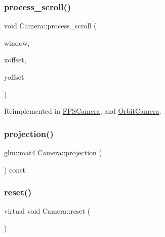 \mbox{\label{classCamera_ac13cc5fa7a3a5c40e53d95e987c1ff04}} 
\subsubsection{\texorpdfstring{process\+\_\+scroll()}{process\_scroll()}}
{\footnotesize\ttfamily void Camera\+::process\+\_\+scroll (\begin{DoxyParamCaption}\item[{G\+L\+F\+Wwindow $\ast$}]{window,  }\item[{double}]{xoffset,  }\item[{double}]{yoffset }\end{DoxyParamCaption})\hspace{0.3cm}{\ttfamily [virtual]}}



Reimplemented in \hyperlink{classFPSCamera_a45640c2e2234cdae4e12bded299e19e8}{F\+P\+S\+Camera}, and \hyperlink{classOrbitCamera_a879faaab86c47e485e119d247279904f}{Orbit\+Camera}.

\mbox{\label{classCamera_afc206d8b4484d0d8c5e7333b34c68c6f}} 
\subsubsection{\texorpdfstring{projection()}{projection()}}
{\footnotesize\ttfamily glm\+::mat4 Camera\+::projection (\begin{DoxyParamCaption}{ }\end{DoxyParamCaption}) const\hspace{0.3cm}{\ttfamily [virtual]}}

\mbox{\label{classCamera_aa7695a960438e5571e14f50ed69f6623}} 
\subsubsection{\texorpdfstring{reset()}{reset()}}
{\footnotesize\ttfamily virtual void Camera\+::reset (\begin{DoxyParamCaption}{ }\end{DoxyParamCaption})\hspace{0.3cm}{\ttfamily [pure virtual]}}



